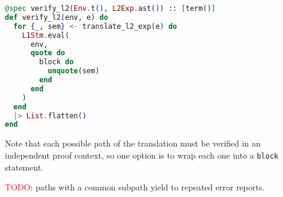 \begin{lstlisting}[language=elixir,numbers=none,frame=none]
@spec verify_l2(Env.t(), L2Exp.ast()) :: [term()]
def verify_l2(env, e) do
  for {_, sem} <- translate_l2_exp(e) do
    L1Stm.eval(
      env,
      quote do
        block do
          unquote(sem)
        end
      end
    )
  end
  |> List.flatten()
end
\end{lstlisting}

Note that each possible path of the translation must be verified in an independent
proof context, so one option is to wrap each one into a \verb|block| statement.

\textcolor{red}{TODO}: paths with a common subpath yield to repeated error reports.
